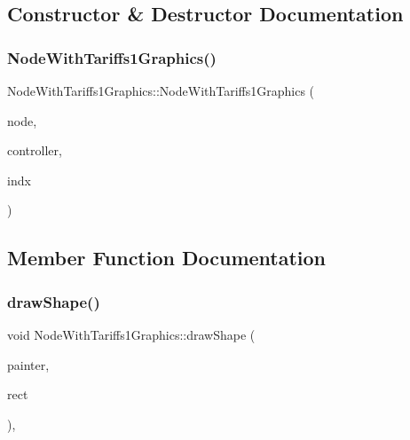 \subsection{Constructor \& Destructor Documentation}
\mbox{\label{class_node_with_tariffs1_graphics_a7e817e64905f4977607d2a2e19e7c739}} 
\subsubsection{\texorpdfstring{NodeWithTariffs1Graphics()}{NodeWithTariffs1Graphics()}}
{\footnotesize\ttfamily Node\+With\+Tariffs1\+Graphics\+::\+Node\+With\+Tariffs1\+Graphics (\begin{DoxyParamCaption}\item[{\mbox{\hyperlink{class_node_data}{Node\+Data}} $\ast$}]{node,  }\item[{\mbox{\hyperlink{class_map_objects_controller}{Map\+Objects\+Controller}} $\ast$}]{controller,  }\item[{int}]{indx }\end{DoxyParamCaption})\hspace{0.3cm}{\ttfamily [inline]}}



\subsection{Member Function Documentation}
\mbox{\label{class_node_with_tariffs1_graphics_a886b4a82beee822a46877b72d7dd3f6e}} 
\subsubsection{\texorpdfstring{drawShape()}{drawShape()}}
{\footnotesize\ttfamily void Node\+With\+Tariffs1\+Graphics\+::draw\+Shape (\begin{DoxyParamCaption}\item[{Q\+Painter \&}]{painter,  }\item[{const qmapcontrol\+::\+Rect\+World\+Px \&}]{rect }\end{DoxyParamCaption})\hspace{0.3cm}{\ttfamily [protected]}, {\ttfamily [virtual]}}



